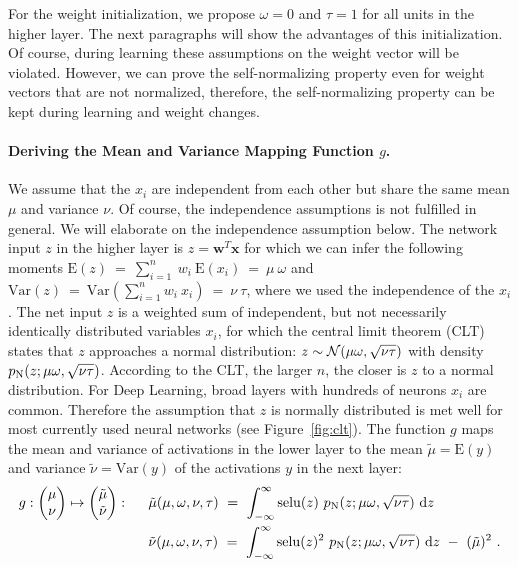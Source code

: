 \documentclass{article}
\newcommand\Bw{\bm{w}}
\newcommand\Bx{\bm{x}}
\newcommand\EXP{\mathbf{\mathrm{E}}}
\newcommand\VAR{\mathbf{\mathrm{Var}}}
\newcommand\munn{{\tilde \mu}}
\newcommand\nunn{{\tilde \nu}}
\DeclareMathOperator{\selu}{selu}
\begin{document}
For the weight initialization, we 
propose $\omega=0$ and $\tau=1$ for all units in the higher layer.
The next paragraphs will show the advantages of this initialization. 
Of course, during learning these assumptions on the weight vector will
be violated. However, we can prove the self-normalizing property
even for weight vectors that are not normalized, therefore, the 
self-normalizing property can be kept during learning and weight changes.



\paragraph{Deriving the Mean and Variance Mapping Function $g$.}
We assume that the $x_i$ are independent from each other but share
the same mean $\mu$ and variance $\nu$. 
Of course, the independence assumptions is 
not fulfilled in general. We will elaborate on the independence
assumption below.  
The network input $z$ in the higher layer 
is $z=\Bw^T \Bx$ for which we can infer the following moments 
$\EXP(z) \ = \ \sum_{i=1}^n  \ w_i \ \EXP(x_i) \ = \ \mu \ \omega$
and 
$\VAR(z) \ = \ \VAR(\sum_{i=1}^n w_i \ x_i)  \ = \ \nu \ \tau$,
where we used the independence of the $x_i$.
The net input $z$ is a weighted sum of independent, 
but not necessarily identically distributed variables $x_i$,
for which the central limit theorem (CLT) states that $z$ approaches a normal distribution:
$z \sim \mathcal{N} (\mu \omega  ,  \sqrt{\nu \tau})$ 
with density $p_{\mathrm{N}}(z  ;  \mu \omega  , \sqrt{\nu \tau})$. 
According to the CLT, the larger $n$, the closer is $z$ to a normal distribution.
For Deep Learning, broad layers with hundreds of neurons $x_i$ are common. 
Therefore the assumption that $z$ is normally distributed is met well for most currently used
neural networks (see Figure~\ref{fig:clt}).
The function $g$ maps the mean and variance of activations in the lower layer to the mean
$\munn=\EXP(y)$ and variance $\nunn=\VAR(y)$ of the activations $y$ in the next layer:
\begin{align}
\label{eq:mappingG}
g:\begin{pmatrix}
\mu \\ \nu 
\end{pmatrix} \mapsto \begin{pmatrix}
\munn \\ \nunn 
\end{pmatrix}: \ \ \quad
&\munn(\mu,\omega, \nu, \tau)   \ = \
\int_{-\infty}^{\infty }\selu(z) \ 
p_{{\rN}}(z;\mu \omega,\sqrt{\nu \tau})\ \mathrm{d}z  \\ \nonumber
& \nunn(\mu,\omega, \nu, \tau)   \ = \ \int_{-\infty}^{\infty} \selu(z)^2 \ 
p_{{\rN}}(z;\mu \omega,\sqrt{\nu \tau})\ \mathrm{d}z  \ - \ (\munn)^2 \ . 
\end{align}
\end{document}
